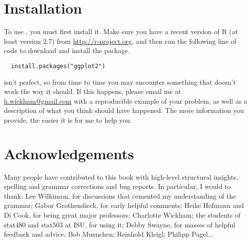 \section{Installation}\label{sub:installation}

To use \ggplot, you must first install it. Make sure you have a recent version of R (at least version 2.7) from \url{http://r-project.org}, and then run the following line of code to download and install the \ggplot package.  

\begin{verbatim}
  install.packages("ggplot2")
\end{verbatim}

% 
% 
% 

\ggplot isn't perfect, so from time to time you may encounter something that doesn't work the way it should.  If this happens, please email me at \href{mailto:h.wickham@gmail.com}{h.wickham@gmail.com} with a reproducible example of your problem, as well as a description of what you think should have happened.  The more information you provide, the easier it is for me to help you.

\section{Acknowledgements}\label{sec:acknolwedgements}

Many people have contributed to this book with high-level structural insights, spelling and grammar corrections and bug reports.  In particular, I would to thank: Lee Wilkinson, for discussions that cemented my understanding of the grammar; Gabor Grothendieck, for early helpful comments; Heike Hofmann and Di Cook, for being great major professors; Charlotte Wickham; the students of stat480 and stat503 at ISU, for using it; Debby Swayne, for masses of helpful feedback and advice; Bob Muenchen; Reinhold Kleigl; Philipp Pagel...


